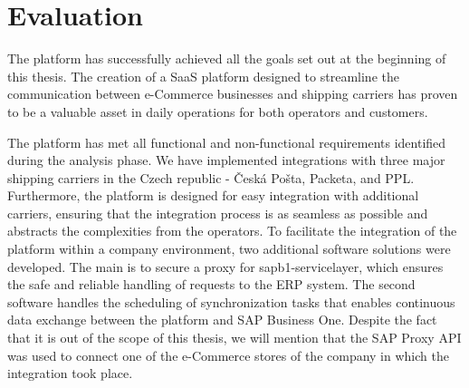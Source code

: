 
\section*{Evaluation}


The platform has successfully achieved all the goals set out at the beginning of this thesis.
The creation of a \ac{SaaS} platform designed to streamline the communication between e-Commerce businesses and shipping carriers has proven to be a valuable asset in daily operations for both operators and customers.

The platform has met all functional and non-functional requirements identified during the analysis phase.
We have implemented integrations with three major shipping carriers in the Czech republic - Česká Pošta, Packeta, and PPL.
Furthermore, the platform is designed for easy integration with additional carriers, ensuring that the integration process is as seamless as possible and abstracts the complexities from the operators.
To facilitate the integration of the platform within a company environment, two additional software solutions were developed.
The main is to secure a proxy for \gls{sapb1-servicelayer}, which ensures the safe and reliable handling of requests to the ERP system.
The second software handles the scheduling of synchronization tasks that enables continuous data exchange between the platform and SAP Business One.
Despite the fact that it is out of the scope of this thesis, we will mention that the SAP Proxy API was used to connect one of the e-Commerce stores of the company in which the integration took place.

